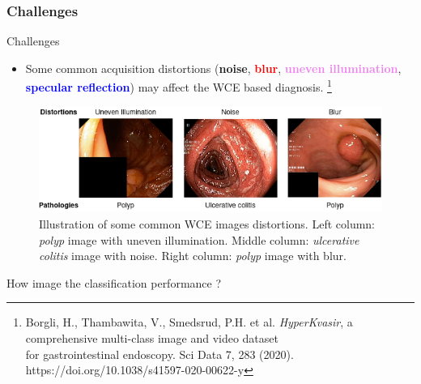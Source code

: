 \documentclass{libs/ufc_format}
\begin{document}
\subsubsection{Challenges}
\begin{frame}{Challenges}
    \begin{itemize}
        \item Some common acquisition distortions (\textbf{noise}, \textcolor{red}{\textbf{blur}}, \textcolor{violet}{\textbf{uneven illumination}}, \textcolor{blue}{\textbf{specular reflection}}) may affect the WCE based diagnosis.         \footnote[frame]{\tiny Borgli, H., Thambawita, V., Smedsrud, P.H. et al. \textit{HyperKvasir}, a comprehensive multi-class image and video dataset \\for gastrointestinal endoscopy. Sci Data 7, 283 (2020). https://doi.org/10.1038/s41597-020-00622-y}
    \end{itemize}


    \begin{figure}
        \centering
        \includegraphics[scale=0.4]{libs/examdis3.png}
        \caption{Illustration of some common WCE images distortions. Left column: \textit{polyp} image with uneven illumination. Middle column: \textit{ulcerative colitis} image with noise. Right column: \textit{polyp} image with blur.}
        \label{fig:endoscopy}
    \end{figure}

\end{frame}

\begin{frame}
    \large How image  the classification performance ?
\end{frame}
\end{document}
